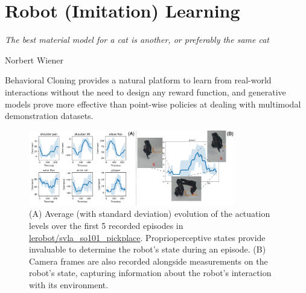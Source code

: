 \section{Robot (Imitation) Learning}
\label{sec:learning-imitation}

\epigraph{\emph{The best material model for a cat is another, or preferably the same cat}}{Norbert Wiener}

\begin{tldr}
Behavioral Cloning provides a natural platform to learn from real-world interactions without the need to design any reward function, and generative models prove more effective than point-wise policies at dealing with multimodal demonstration datasets.
\end{tldr}


% 

\begin{figure}
    \centering
    \includegraphics[width=0.8\textwidth]{figures/ch4/ch4-bc-trajectories.png}
    \caption{(A) Average (with standard deviation) evolution of the actuation levels over the first 5 recorded episodes in \url{lerobot/svla_so101_pickplace}. Proprioperceptive states provide invaluable to determine the robot's state during an episode. (B) Camera frames are also recorded alongside measurements on the robot's state, capturing information about the robot's interaction with its environment.}
    \label{fig:ch4-bc-trajectories}
\end{figure}

